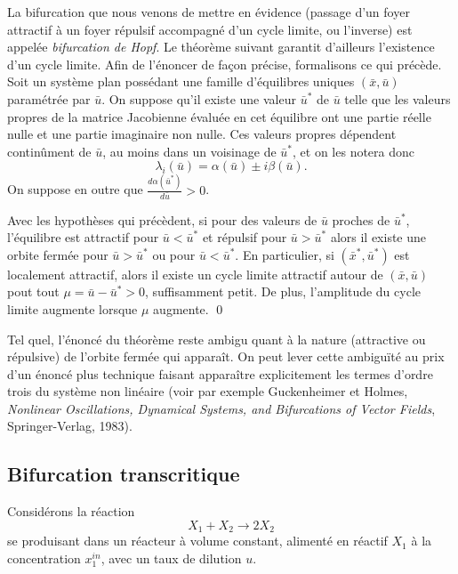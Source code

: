 La bifurcation que nous venons de mettre en {é}vidence
(passage d'un foyer attractif {à} un foyer répulsif accompagn{é} d'un cycle limite, ou l'inverse) est
appel{é}e {\em bifurcation de Hopf}. Le th{é}or{è}me suivant garantit d'ailleurs
l'existence d'un cycle limite. Afin de l'{é}noncer de fa\c con pr{é}cise, formalisons ce qui pr{é}c{è}de.  Soit un syst{è}me plan poss{é}dant une famille d'{é}quilibres uniques $(\bar x, \bar u)$ param{é}tr{é}e par $\bar u$. On suppose qu'il existe une valeur $\bar u^*$ de $\bar u$ 
telle que les valeurs propres de la matrice Jacobienne évaluée en cet
 {é}quilibre ont une partie r{é}elle nulle et une partie imaginaire non nulle. Ces valeurs propres d{é}pendent contin{\^u}ment de $\bar u$, au moins dans un voisinage de $\bar u^*$, et on les notera donc $$\lambda_i(\bar u)=\alpha(\bar u)\pm i \beta(\bar u).$$ On suppose en outre que $\frac{d\alpha(\bar u^*)}{d\bar u}>0$.

\begin{theoreme}
Avec les hypoth{è}ses qui pr{é}c{è}dent, si pour des valeurs de
 $\bar u$ proches de $\bar u^*$, l'{é}quilibre est attractif 
 pour $\bar u <\bar u^*$ et répulsif pour $\bar u >\bar u^*$ alors il
  existe une orbite ferm{é}e pour $\bar u>\bar u^*$ ou pour $\bar u<\bar u^*$. 
  En particulier, si $(\bar x^*,\bar u^*)$ est localement
   attractif, alors il existe un cycle limite attractif autour de 
  $(\bar x,\bar u)$ pout tout $\mu=\bar u-\bar u^*>0$, suffisamment petit.
   De plus, l'amplitude du cycle limite augmente lorsque $\mu$ augmente.
   \qed
\end{theoreme}
   
\begin{remarque}
Tel quel, l'{é}nonc{é} du th{é}or{è}me reste 
ambigu quant {à} la nature (attractive ou r{é}pulsive) de l'orbite 
ferm{é}e qui apparaît. On peut lever cette ambiguïté au prix 
d'un {é}nonc{é} plus technique faisant apparaître explicitement 
les termes d'ordre trois du syst{è}me non lin{é}aire
(voir par exemple Guckenheimer et Holmes, 
{\em Nonlinear Oscillations, Dynamical Systems, and Bifurcations of Vector 
Fields}, Springer-Verlag, 1983). 
\end{remarque}

\subsection{Bifurcation transcritique}

Consid{é}rons  la r{é}action $$X_1
+ X_2 \rightarrow 2 X_2$$ se produisant dans un r{é}acteur {à} volume constant, aliment{é}
en r{é}actif $X_1$ {à} la concentration $x_1^{in}$, avec un taux de dilution $u$.

